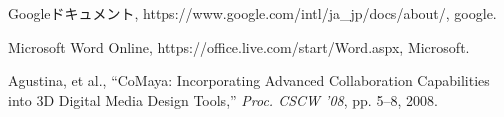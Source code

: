\renewcommand{\bibname}{参考文献}
\begin{thebibliography}{Longest9}

Googleドキュメント, https://www.google.com/intl/ja_jp/docs/about/, google.

Microsoft Word Online, https://office.live.com/start/Word.aspx, Microsoft.

Agustina, et al., ``CoMaya: Incorporating Advanced Collaboration Capabilities into 3D Digital Media Design Tools,'' {\it Proc. CSCW '08}, pp. 5--8, 2008.
\end{thebibliography}
